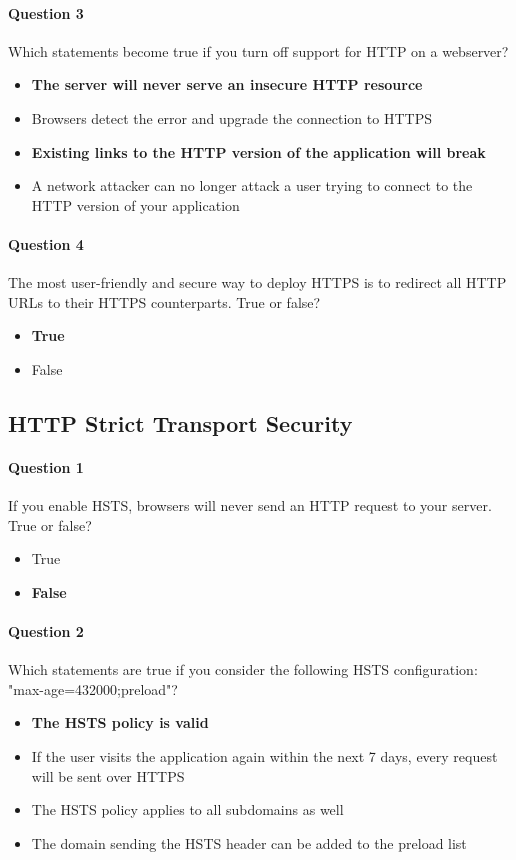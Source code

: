 \documentclass[titlepage]{article}
\begin{document}
    \paragraph{Question 3} Which statements become true if you turn off support for HTTP on a webserver?
    \begin{itemize}
        \item \textbf{The server will never serve an insecure HTTP resource} \checkmark
        \item Browsers detect the error and upgrade the connection to HTTPS
        \item \textbf{Existing links to the HTTP version of the application will break} \checkmark
        \item A network attacker can no longer attack a user trying to connect to the HTTP version of your application
    \end{itemize}
    \paragraph{Question 4} The most user-friendly and secure way to deploy HTTPS is to redirect all HTTP URLs to their HTTPS counterparts. True or false?
    \begin{itemize}
        \item \textbf{True} \checkmark
        \item False
    \end{itemize}
    \subsection{HTTP Strict Transport Security}
    \paragraph{Question 1} If you enable HSTS, browsers will never send an HTTP request to your server. True or false?
    \begin{itemize}
        \item True
        \item \textbf{False} \checkmark
    \end{itemize}
    \paragraph{Question 2} Which statements are true if you consider the following HSTS configuration: "max-age=432000;preload"?
    \begin{itemize}
        \item \textbf{The HSTS policy is valid} \checkmark
        \item If the user visits the application again within the next 7 days, every request will be sent over HTTPS
        \item The HSTS policy applies to all subdomains as well
        \item The domain sending the HSTS header can be added to the preload list
    \end{itemize}
\end{document}
